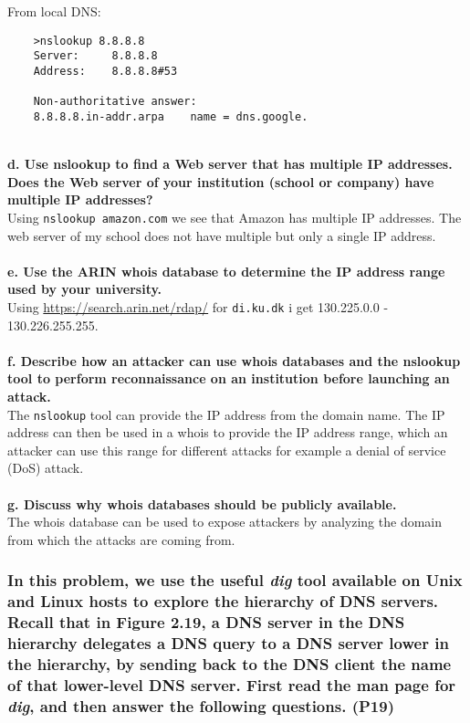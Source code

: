 From local DNS:
\begin{verbatim}
    >nslookup 8.8.8.8
    Server:		8.8.8.8
    Address:	8.8.8.8#53

    Non-authoritative answer:
    8.8.8.8.in-addr.arpa	name = dns.google.
\end{verbatim}
\noindent
\\
\textbf{d. Use nslookup to find a Web server that has multiple IP addresses. Does the Web server of your institution (school or company) have multiple IP addresses?} \\
Using \texttt{nslookup amazon.com} we see that Amazon has multiple IP addresses. The web server of my school does not have multiple but only a single IP address.\\
\\
\textbf{e. Use the ARIN whois database to determine the IP address range used by your university.} \\
Using \url{https://search.arin.net/rdap/} for \texttt{di.ku.dk} i get 130.225.0.0 - 130.226.255.255. \\
\\
\textbf{f. Describe how an attacker can use whois databases and the nslookup tool to perform reconnaissance on an institution before launching an attack.} \\
The \texttt{nslookup} tool can provide the IP address from the domain name. The IP address can then be used in a whois to provide the IP address range, which an attacker can use this range for different attacks for example a denial of service (DoS) attack. \\
\\
\textbf{g. Discuss why whois databases should be publicly available.} \\
The whois database can be used to expose attackers by analyzing the domain from which the attacks are coming from.

\subsubsection{In this problem, we use the useful \textit{dig} tool available on Unix and Linux hosts to explore the hierarchy of DNS servers. Recall that in Figure 2.19, a DNS server in the DNS hierarchy delegates a DNS query to a DNS server lower in the hierarchy, by sending back to the DNS client the name of that lower-level DNS server. First read the man page for \textit{dig}, and then answer the following questions. (P19)}

